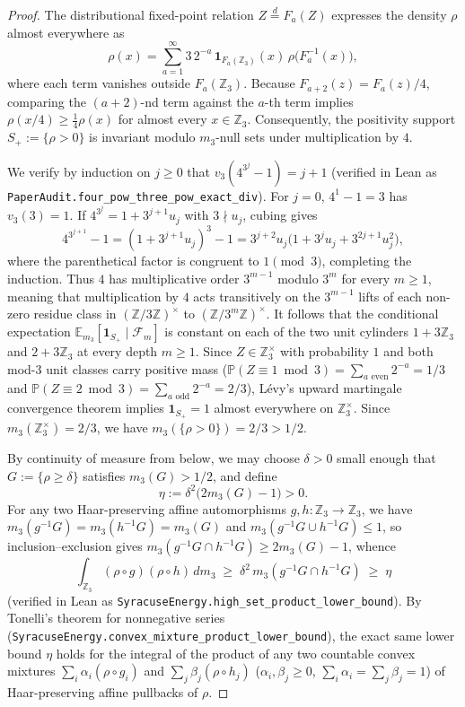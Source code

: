 \documentclass[11pt,a4paper]{article}
\numberwithin{equation}{section}
\theoremstyle{definition}
\theoremstyle{remark}
\newcommand{\Z}{\mathbb{Z}}
\newcommand{\E}{\mathbb{E}}
\renewcommand{\P}{\mathbb{P}}
\newcommand{\cF}{\mathcal{F}}
\begin{document}
\begin{proof}
The distributional fixed-point relation $Z \stackrel{d}{=} F_a(Z)$ expresses the density $\rho$ almost everywhere as
\[
 \rho(x) = \sum_{a=1}^\infty 3\,2^{-a}\,\mathbf{1}_{F_a(\Z_3)}(x)\,\rho\bigl(F_a^{-1}(x)\bigr),
\]
where each term vanishes outside $F_a(\Z_3)$. Because $F_{a+2}(z) = F_a(z)/4$, comparing the $(a+2)$-nd term against the $a$-th term implies $\rho(x/4) \ge \frac{1}{4}\rho(x)$ for almost every $x \in \Z_3$. Consequently, the positivity support $S_+ := \{\rho > 0\}$ is invariant modulo $m_3$-null sets under multiplication by $4$.

We verify by induction on $j \ge 0$ that $v_3(4^{3^j} - 1) = j + 1$ (verified in Lean as \texttt{PaperAudit.four\_pow\_three\_pow\_exact\_div}). For $j = 0$, $4^1 - 1 = 3$ has $v_3(3) = 1$. If $4^{3^j} = 1 + 3^{j+1} u_j$ with $3 \nmid u_j$, cubing gives
\[
 4^{3^{j+1}} - 1 = (1 + 3^{j+1} u_j)^3 - 1 = 3^{j+2} u_j\bigl(1 + 3^j u_j + 3^{2j+1} u_j^2\bigr),
\]
where the parenthetical factor is congruent to $1 \pmod 3$, completing the induction. Thus $4$ has multiplicative order $3^{m-1}$ modulo $3^m$ for every $m \ge 1$, meaning that multiplication by $4$ acts transitively on the $3^{m-1}$ lifts of each non-zero residue class in $(\Z/3\Z)^\times$ to $(\Z/3^m\Z)^\times$. It follows that the conditional expectation $\E_{m_3}[\mathbf{1}_{S_+} \mid \cF_m]$ is constant on each of the two unit cylinders $1 + 3\Z_3$ and $2 + 3\Z_3$ at every depth $m \ge 1$. Since $Z \in \Z_3^\times$ with probability $1$ and both mod-$3$ unit classes carry positive mass ($\P(Z \equiv 1 \bmod 3) = \sum_{a \text{ even}} 2^{-a} = 1/3$ and $\P(Z \equiv 2 \bmod 3) = \sum_{a \text{ odd}} 2^{-a} = 2/3$), L\'evy's upward martingale convergence theorem implies $\mathbf{1}_{S_+} = 1$ almost everywhere on $\Z_3^\times$. Since $m_3(\Z_3^\times) = 2/3$, we have $m_3(\{\rho > 0\}) = 2/3 > 1/2$.

By continuity of measure from below, we may choose $\delta > 0$ small enough that $G := \{\rho \ge \delta\}$ satisfies $m_3(G) > 1/2$, and define
\[
 \eta := \delta^2\bigl(2 m_3(G) - 1\bigr) > 0.
\]
For any two Haar-preserving affine automorphisms $g, h : \Z_3 \to \Z_3$, we have $m_3(g^{-1}G) = m_3(h^{-1}G) = m_3(G)$ and $m_3(g^{-1}G \cup h^{-1}G) \le 1$, so inclusion--exclusion gives $m_3(g^{-1}G \cap h^{-1}G) \ge 2 m_3(G) - 1$, whence
\[
 \int_{\Z_3} (\rho \circ g)(\rho \circ h)\,dm_3 \;\ge\; \delta^2\,m_3(g^{-1}G \cap h^{-1}G) \;\ge\; \eta
\]
(verified in Lean as \texttt{SyracuseEnergy.high\_set\_product\_lower\_bound}). By Tonelli's theorem for nonnegative series (\texttt{SyracuseEnergy.convex\_mixture\_product\_lower\_bound}), the exact same lower bound $\eta$ holds for the integral of the product of any two countable convex mixtures $\sum_i \alpha_i (\rho \circ g_i)$ and $\sum_j \beta_j (\rho \circ h_j)$ ($\alpha_i, \beta_j \ge 0$, $\sum_i \alpha_i = \sum_j \beta_j = 1$) of Haar-preserving affine pullbacks of $\rho$.


\end{proof}
\end{document}
